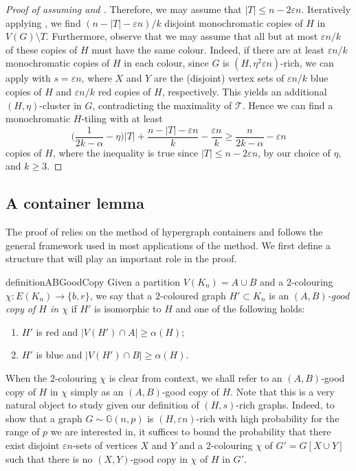 \documentclass[a4paper,reqno,11pt]{amsart}
\theoremstyle{definition}
\theoremstyle{remark}
\renewcommand\leq{\leqslant}
\renewcommand\le{\leqslant}
\renewcommand\ge{\geqslant}
\renewcommand\to{\rightarrow}
\begin{document}
\begin{proof}[Proof of  assuming  and ]
Therefore, we may assume that $|T|\leq n-2\varepsilon n$. Iteratively applying , we find $(n-|T|-\varepsilon n)/k$ disjoint monochromatic copies of $H$ in $V(G)\setminus T$. Furthermore, observe that we may assume that all but at most $\varepsilon n/k$ of these copies of $H$ must have the same colour. Indeed, if there are at least $\varepsilon n/k$ monochromatic copies of $H$ in each colour, since $G$ is $(H,\eta^2\varepsilon n)$-rich, we can apply  with $s=\varepsilon n$, where $X$ and $Y$ are the (disjoint) vertex sets of $\varepsilon n/k$ blue copies of $H$ and $\varepsilon n/k$ red copies of $H$, respectively. This yields an additional $(H,\eta)$-cluster in $G$, contradicting the maximality of $\mathcal{T}$. Hence we can find a monochromatic $H$-tiling with at least
\begin{equation*}
    \Big(\frac{1}{2k-\alpha}-\eta\Big)|T| + \frac{n-|T|-\varepsilon n}{k} - \frac{\varepsilon n}{k} \ge \frac{n}{2k-\alpha}-\varepsilon n 
\end{equation*}
copies of $H$, where the inequality is true since $|T| \le n-2\varepsilon n$, by our choice of $\eta$, and $k \ge 3$.
\end{proof}

\subsection{A container lemma}\label{subsec:containers} The proof of  relies on the method of hypergraph containers and follows the general framework used in most applications of the method. We first define a structure that will play an important role in the proof.

\begin{restatable}{definition}{ABGoodCopy}
\label{def:ABgood}
Given a partition $V(K_n)=A\cup B$ and a $2$-colouring $\chi\colon E(K_n) \to \{b,r\}$, we say that a $2$-coloured graph $H' \subset K_n$ is an \emph{$(A,B)$-good copy of $H$ in $\chi$} if $H'$ is isomorphic to $H$ and one of the following holds: \begin{enumerate}[label = (\roman*)]
\item\label{item:good1} $H'$ is red and $|V(H') \cap A| \ge \alpha(H)$;
\item\label{item:good2} $H'$ is blue and $|V(H') \cap B| \ge \alpha(H)$.
\end{enumerate}
\end{restatable}
When the $2$-colouring $\chi$ is clear from context, we shall refer to an $(A,B)$-good copy of $H$ in $\chi$ simply as an $(A,B)$-good copy of $H$. Note that this is a very natural object to study given our definition of $(H,s)$-rich graphs. Indeed, to show that a graph $G\sim\mathbb{G}(n,p)$ is $(H,\varepsilon n)$-rich with high probability for the range of $p$ we are interested in, it suffices to bound the probability that there exist disjoint $\varepsilon n$-sets of vertices $X$ and $Y$ and a $2$-colouring $\chi$ of $G'=G[X \cup Y]$ such that there is no $(X,Y)$-good copy in $\chi$ of $H$ in $G'$.
\end{document}
